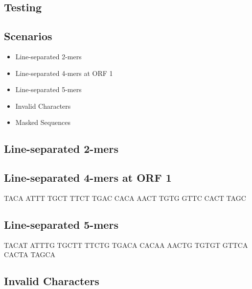 \documentclass[12pt,notitlepage]{article}
\begin{document}
\begin{s5presentation}
\begin{ifhtml}
    \begin{s5slide}
      \section{Testing}
      \subsection{Scenarios}
      \begin{itemize}
      \item Line-separated 2-mers
      \item Line-separated 4-mers at ORF 1
      \item Line-separated 5-mers
      \item Invalid Characters
      \item Masked Sequences
      \end{itemize}
    \end{s5slide}

    \begin{s5slide}
      \section{Line-separated 2-mers}
    \end{s5slide}

    \begin{s5slide}
      \section{Line-separated 4-mers at ORF 1}
      TACA
ATTT
TGCT
TTCT
TGAC
CACA
AACT
TGTG
GTTC
CACT
TAGC
    \end{s5slide}

    \begin{s5slide}
      \section{Line-separated 5-mers}
      TACAT
ATTTG
TGCTT
TTCTG
TGACA
CACAA
AACTG
TGTGT
GTTCA
CACTA
TAGCA
    \end{s5slide}

    \begin{s5slide}
      \section{Invalid Characters}
    \end{s5slide}


\end{ifhtml}
\end{s5presentation}
\end{document}

